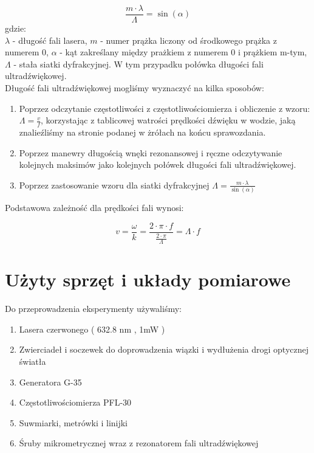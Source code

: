 \documentclass[a4paper,12pt]{article}
\begin{document}
$$ \frac{m \cdot \lambda}{\Lambda}=\sin (\alpha) $$
gdzie: \\
$\lambda$ - długość fali lasera, 
$m$ - numer prążka liczony od środkowego prążka z numerem 0, 
$ \alpha $ - kąt zakreślany między prażkiem z numerem 0 i prążkiem m-tym,
$ \Lambda $ - stała siatki dyfrakcyjnej. W tym przypadku połówka długości fali ultradźwiękowej. \\

Długość fali ultradźwiękowej mogliśmy wyznaczyć na kilka sposobów:
\begin{enumerate}
  \item Poprzez odczytanie częstotliwości z częstotliwościomierza  i obliczenie z wzoru: $\Lambda=\frac{v}{f}$, korzystając z tablicowej watrości prędkości dźwięku w wodzie, jaką znalieźliśmy na stronie podanej w żrółach na końcu sprawozdania. 
  \item Poprzez manewry długością wnęki rezonansowej i ręczne odczytywanie kolejnych maksimów jako kolejnych połówek długości fali ultradźwiękowej.
  \item Poprzez zastosowanie wzoru dla siatki dyfrakcyjnej $\Lambda=\frac{m \cdot \lambda}{\sin (\alpha)}$
\end{enumerate}

Podstawowa zależność dla prędkości fali wynosi: 

$$v = \frac{\omega}{k} = \frac{2\cdot \pi \cdot f }{\frac{2\cdot \pi}{\Lambda} }= \Lambda \cdot f $$


\section{Użyty sprzęt i układy pomiarowe}



Do przeprowadzenia eksperymenty używaliśmy: 

\begin{enumerate}
  \item Lasera czerwonego ( 632.8 nm , 1mW ) 
  \item Zwierciadeł i soczewek do doprowadzenia wiązki i wydłużenia drogi optycznej światła
  \item Generatora G-35
  \item Częstotliwościomierza PFL-30
  \item Suwmiarki, metrówki i linijki  
  \item Śruby mikrometrycznej wraz z rezonatorem fali ultradźwiękowej
\end{enumerate}
\end{document}
